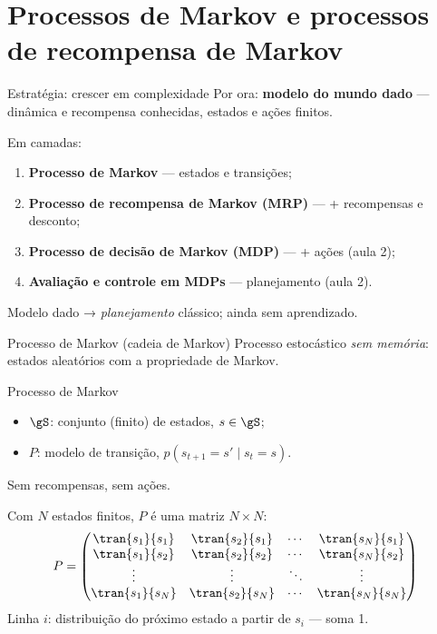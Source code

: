 \documentclass[aspectratio=169, 11pt]{beamer}
\begin{document}
\section{Processos de Markov e processos de recompensa de Markov}

\begin{frame}{Estratégia: crescer em complexidade}
  Por ora: \textbf{modelo do mundo dado} — dinâmica e recompensa conhecidas, estados e ações finitos.

  \medskip
  Em camadas:
  \begin{enumerate}
    \item \textbf{Processo de Markov} — estados e transições;
    \item \textbf{Processo de recompensa de Markov (MRP)} — + recompensas e desconto;
    \item \textbf{Processo de decisão de Markov (MDP)} — + ações (aula 2);
    \item \textbf{Avaliação e controle em MDPs} — planejamento (aula 2).
  \end{enumerate}

  \medskip
  {\small\color{rlCinza} Modelo dado → \emph{planejamento} clássico; ainda sem aprendizado.}
\end{frame}

\begin{frame}{Processo de Markov (cadeia de Markov)}
  Processo estocástico \emph{sem memória}: estados aleatórios com a propriedade de Markov.

  \begin{defbox}{Processo de Markov}
    \begin{itemize}
      \item $\gS$: conjunto (finito) de estados, $s \in \gS$;
      \item $P$: modelo de transição, $p(s_{t+1} = s' \mid s_t = s)$.
    \end{itemize}
    Sem recompensas, sem ações.
  \end{defbox}

  Com $N$ estados finitos, $P$ é uma matriz $N \times N$:
  {\small
  \[
    P =
    \begin{pmatrix}
      \tran{s_1}{s_1} & \tran{s_2}{s_1} & \cdots & \tran{s_N}{s_1} \\
      \tran{s_1}{s_2} & \tran{s_2}{s_2} & \cdots & \tran{s_N}{s_2} \\
      \vdots          & \vdots          & \ddots & \vdots          \\
      \tran{s_1}{s_N} & \tran{s_2}{s_N} & \cdots & \tran{s_N}{s_N}
    \end{pmatrix}
  \]}%
  \vspace{-0.8em}
  {\small\color{rlCinza} Linha $i$: distribuição do próximo estado a partir de $s_i$ — soma 1.}
\end{frame}
\end{document}
